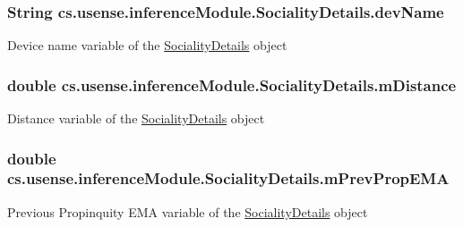 \subsubsection[{dev\+Name}]{\setlength{\rightskip}{0pt plus 5cm}String cs.\+usense.\+inference\+Module.\+Sociality\+Details.\+dev\+Name}\label{classcs_1_1usense_1_1inference_module_1_1_sociality_details_ae31fcda774a26e9eaa301d1c849c862e}
Device name variable of the \hyperlink{classcs_1_1usense_1_1inference_module_1_1_sociality_details}{Sociality\+Details} object \hypertarget{classcs_1_1usense_1_1inference_module_1_1_sociality_details_a8fc3a7f6a0a00f2023f9587cdbe1d109}{}
\subsubsection[{m\+Distance}]{\setlength{\rightskip}{0pt plus 5cm}double cs.\+usense.\+inference\+Module.\+Sociality\+Details.\+m\+Distance}\label{classcs_1_1usense_1_1inference_module_1_1_sociality_details_a8fc3a7f6a0a00f2023f9587cdbe1d109}
Distance variable of the \hyperlink{classcs_1_1usense_1_1inference_module_1_1_sociality_details}{Sociality\+Details} object \hypertarget{classcs_1_1usense_1_1inference_module_1_1_sociality_details_a40f01a69da27931a3c271a948d99d452}{}
\subsubsection[{m\+Prev\+Prop\+E\+M\+A}]{\setlength{\rightskip}{0pt plus 5cm}double cs.\+usense.\+inference\+Module.\+Sociality\+Details.\+m\+Prev\+Prop\+E\+M\+A}\label{classcs_1_1usense_1_1inference_module_1_1_sociality_details_a40f01a69da27931a3c271a948d99d452}
Previous Propinquity E\+M\+A variable of the \hyperlink{classcs_1_1usense_1_1inference_module_1_1_sociality_details}{Sociality\+Details} object \hypertarget{classcs_1_1usense_1_1inference_module_1_1_sociality_details_a28f866785375e83e1b1a917f40299fac}{}

